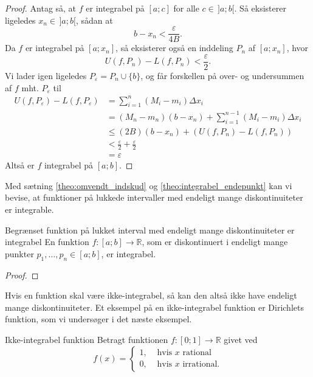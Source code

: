 \begin{proof}
  Antag så, at $f$ er integrabel på $[a;c]$ for alle $c \in \,]a;b[$.
  Så eksisterer ligeledes $x_n \in \,]a;b[$, sådan at
  \[
  b-x_n < \frac{\varepsilon }{4 B}. 
  \] 
  Da $f$ er integrabel på $[a;x_n]$, så eksisterer også en inddeling $P_n$ af $[a;x_n]$, hvor
  \[
  U(f, P_n)-L(f, P_n) < \frac{\varepsilon }{2}. 
  \] 
  Vi lader igen ligeledes $P _{\varepsilon }=P_n \cup \{ b \} $, og får forskellen på over- og undersummen af $f$ mht. $P _{\varepsilon }$ til
  \begin{equation*}
  \begin{split}
  U(f, P_{\varepsilon })-L(f, P_{\varepsilon })&= \sum_{i  =1}^{n} (M_i - m_i) \Delta x_i \\
    &=(M_n-m_n)(b-x_n) + \sum_{i =1}^{n-1} (M_i - m_i) \Delta x_i \\
    &\leq \left(2 B\right) (b-x_n) +(U(f, P_n)-L(f, P_n)) \\
    &<\frac{\varepsilon }{2} + \frac{\varepsilon }{2}\\
    &=\varepsilon 
  \end{split}
  \end{equation*}
  Altså er $f$ integrabel på $[a;b]$.
\end{proof}

Med sætning \ref{theo:omvendt_indskud} og \ref{theo:integrabel_endepunkt} kan vi bevise, at funktioner på lukkede intervaller med endeligt mange diskontinuiteter er integrable.

\begin{theorem}[label=theo:endelig_diskontinuiert_integrabel]{Begrænset funktion på lukket interval med endeligt mange diskontinuiteter er integrabel}{}
  En funktion $f:[a;b] \to \mathbb{R}$, som er diskontinuert i endeligt mange punkter $p_1, \ldots , p_n \in [a;b]$, er integrabel.
\end{theorem}
\begin{proof} 
  
\end{proof}

Hvis en funktion skal være ikke-integrabel, så kan den altså ikke have endeligt mange diskontinuiteter.
Et eksempel på en ikke-integrabel funktion er Dirichlets funktion, som vi undersøger i det næste eksempel.

\begin{example}[label=exa:ikke-integrabel]{Ikke-integrabel funktion}{}
  Betragt funktionen $f:[0;1] \to \mathbb{R}$ givet ved
  \[
  f(x)= 
  \begin{cases}
    1, &\text{ hvis } x \text{ rational }\\
    0, &\text{ hvis } x \text{ irrational.}
  \end{cases}
  \] 
\end{example}


